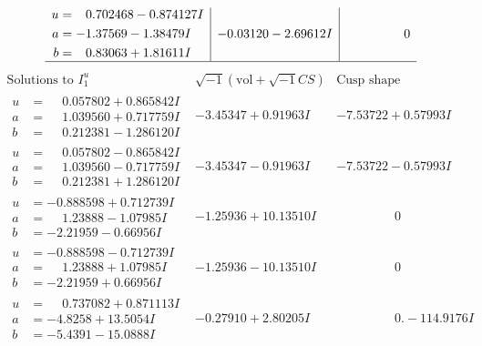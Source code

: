 \documentclass[1p]{elsarticle_modified}
\theoremstyle{definition}
\newcommand{\I}{\sqrt{-1}}
\begin{document}
$$\begin{array}{c|c|c}
\begin{aligned}
u &= \phantom{-}0.702468 - 0.874127 I \\
a &= -1.37569 - 1.38479 I \\
b &= \phantom{-}0.83063 + 1.81611 I\end{aligned}
 & -0.03120 - 2.69612 I & \phantom{-0.000000 } 0\\
 \hline 
 \end{array}$$\newpage$$\begin{array}{c|c|c}  
\text{Solutions to }I^u_{1}& \I (\text{vol} + \sqrt{-1}CS) & \text{Cusp shape}\\
 \hline 
\begin{aligned}
u &= \phantom{-}0.057802 + 0.865842 I \\
a &= \phantom{-}1.039560 + 0.717759 I \\
b &= \phantom{-}0.212381 - 1.286120 I\end{aligned}
 & -3.45347 + 0.91963 I & -7.53722 + 0.57993 I \\ \hline\begin{aligned}
u &= \phantom{-}0.057802 - 0.865842 I \\
a &= \phantom{-}1.039560 - 0.717759 I \\
b &= \phantom{-}0.212381 + 1.286120 I\end{aligned}
 & -3.45347 - 0.91963 I & -7.53722 - 0.57993 I \\ \hline\begin{aligned}
u &= -0.888598 + 0.712739 I \\
a &= \phantom{-}1.23888 - 1.07985 I \\
b &= -2.21959 - 0.66956 I\end{aligned}
 & -1.25936 + 10.13510 I & \phantom{-0.000000 } 0 \\ \hline\begin{aligned}
u &= -0.888598 - 0.712739 I \\
a &= \phantom{-}1.23888 + 1.07985 I \\
b &= -2.21959 + 0.66956 I\end{aligned}
 & -1.25936 - 10.13510 I & \phantom{-0.000000 } 0 \\ \hline\begin{aligned}
u &= \phantom{-}0.737082 + 0.871113 I \\
a &= -4.8258 + 13.5054 I \\
b &= -5.4391 - 15.0888 I\end{aligned}
 & -0.27910 + 2.80205 I & \phantom{-0.000000 } 0. - 114.9176 I \\ \hline\begin{aligned}

\end{aligned}
\end{array}$$
\end{document}
